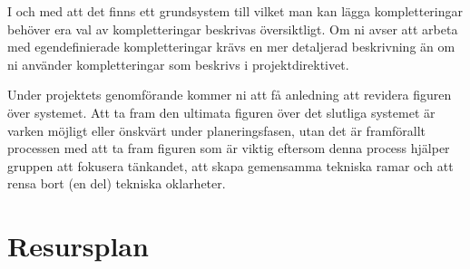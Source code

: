 \documentclass[a4paper]{article}
\begin{document}
I och med att det finns ett grundsystem till vilket man kan lägga
kompletteringar behöver era val av kompletteringar beskrivas
översiktligt. Om ni avser att arbeta med egendefinierade kompletteringar
krävs en mer detaljerad beskrivning än om ni använder kompletteringar
som beskrivs i projektdirektivet.

Under projektets genomförande kommer ni att få anledning att revidera
figuren över systemet. Att ta fram den ultimata figuren över det
slutliga systemet är varken möjligt eller önskvärt under
planeringsfasen, utan det är framförallt processen med att ta fram
figuren som är viktig eftersom denna process hjälper gruppen att
fokusera tänkandet, att skapa gemensamma tekniska ramar och att rensa
bort (en del) tekniska oklarheter.
\fi


\section{Resursplan}
\label{sec:resursplan}

%
\end{document}
